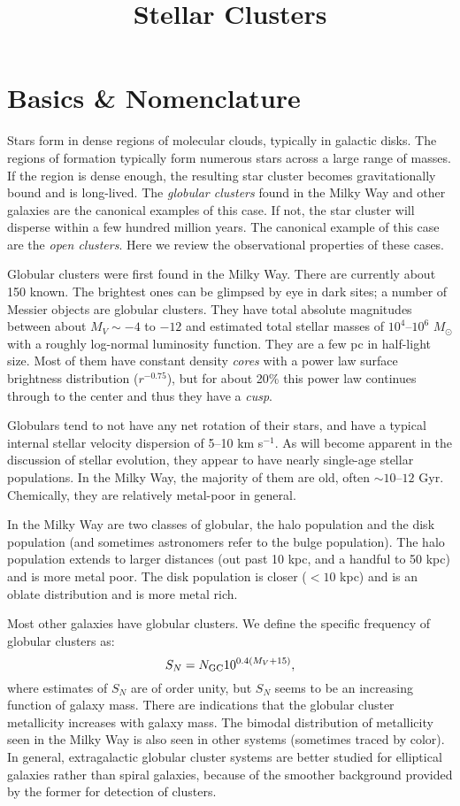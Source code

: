 \title{\bf Stellar Clusters}

\section{Basics \& Nomenclature}

Stars form in dense regions of molecular clouds, typically in galactic
disks. The regions of formation typically form numerous stars across a
large range of masses. If the region is dense enough, the resulting
star cluster becomes gravitationally bound and is long-lived. The {\it
  globular clusters} found in the Milky Way and other galaxies are the
canonical examples of this case. If not, the star cluster will
disperse within a few hundred million years. The canonical example of
this case are the {\it open clusters}. Here we review the
observational properties of these cases.

Globular clusters were first found in the Milky Way. There are
currently about 150 known. The brightest ones can be glimpsed by eye
in dark sites; a number of Messier objects are globular clusters. They
have total absolute magnitudes between about $M_V \sim -4$ to $-12$
and estimated total stellar masses of $10^4$--$10^6$ $M_\odot$ with a
roughly log-normal luminosity function. They are a few pc in
half-light size.  Most of them have constant density {\it cores} with
a power law surface brightness distribution ($r^{-0.75}$), but for
about 20\% this power law continues through to the center and thus
they have a {\it cusp}.

Globulars tend to not have any net rotation of their stars, and have a
typical internal stellar velocity dispersion of 5--10 km s$^{-1}$. As
will become apparent in the discussion of stellar evolution, they
appear to have nearly single-age stellar populations. In the Milky
Way, the majority of them are old, often $\sim 10$--$12$
Gyr. Chemically, they are relatively metal-poor in general.

In the Milky Way are two classes of globular, the halo population and
the disk population (and sometimes astronomers refer to the bulge
population). The halo population extends to larger distances (out past
10 kpc, and a handful to 50 kpc) and is more metal poor. The disk
population is closer ($< 10$ kpc) and is an oblate distribution and is
more metal rich. 

Most other galaxies have globular clusters. We define the specific
frequency of globular clusters as:
\begin{equation}
S_N = N_{\rm GC} 10^{0.4(M_V + 15)},
\end{equation}
where estimates of $S_N$ are of order unity, but $S_N$ seems to be an
increasing function of galaxy mass. There are indications that the
globular cluster metallicity increases with galaxy mass. The bimodal
distribution of metallicity seen in the Milky Way is also seen in
other systems (sometimes traced by color). In general, extragalactic
globular cluster systems are better studied for elliptical galaxies
rather than spiral galaxies, because of the smoother background
provided by the former for detection of clusters.

